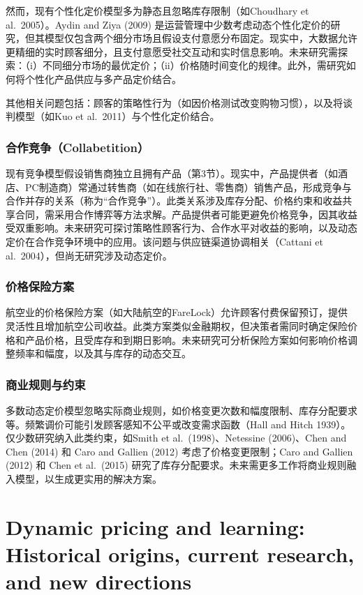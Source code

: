 然而，现有个性化定价模型多为静态且忽略库存限制（如Choudhary et al.~2005）。Aydin and Ziya (2009) 是运营管理中少数考虑动态个性化定价的研究，但其模型仅包含两个细分市场且假设支付意愿分布固定。现实中，大数据允许更精细的实时顾客细分，且支付意愿受社交互动和实时信息影响。未来研究需探索：（i）不同细分市场的最优定价；（ii）价格随时间变化的规律。此外，需研究如何将个性化产品供应与多产品定价结合。

其他相关问题包括：顾客的策略性行为（如因价格测试改变购物习惯），以及将谈判模型（如Kuo et al.~2011）与个性化定价结合。

\subsubsection{合作竞争（Collabetition）}
现有竞争模型假设销售商独立且拥有产品（第3节）。现实中，产品提供者（如酒店、PC制造商）常通过转售商（如在线旅行社、零售商）销售产品，形成竞争与合作并存的关系（称为“合作竞争”）。此类关系涉及库存分配、价格约束和收益共享合同，需采用合作博弈等方法求解。产品提供者可能更避免价格竞争，因其收益受双重影响。未来研究可探讨策略性顾客行为、合作水平对收益的影响，以及动态定价在合作竞争环境中的应用。该问题与供应链渠道协调相关（Cattani et al.~2004），但尚无研究涉及动态定价。

\subsubsection{价格保险方案}
航空业的价格保险方案（如大陆航空的FareLock）允许顾客付费保留预订，提供灵活性且增加航空公司收益。此类方案类似金融期权，但决策者需同时确定保险价格和产品价格，且受库存和到期日影响。未来研究可分析保险方案如何影响价格调整频率和幅度，以及其与库存的动态交互。

\subsubsection{商业规则与约束}
多数动态定价模型忽略实际商业规则，如价格变更次数和幅度限制、库存分配要求等。频繁调价可能引发顾客感知不公平或改变需求函数（Hall and Hitch 1939）。仅少数研究纳入此类约束，如Smith et al.~(1998)、Netessine (2006)、Chen and Chen (2014) 和 Caro and Gallien (2012) 考虑了价格变更限制；Caro and Gallien (2012) 和 Chen et al.~(2015) 研究了库存分配要求。未来需更多工作将商业规则融入模型，以生成更实用的解决方案。



\section{Dynamic pricing and learning: Historical origins, current research, and new directions}

